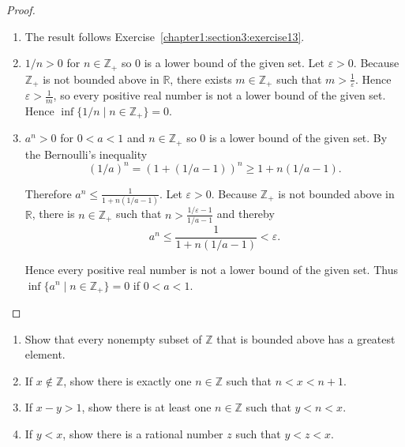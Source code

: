\begin{proof}
    \begin{enumerate}[label={(\alph*)}]
        \item The result follows Exercise~\ref{chapter1:section3:exercise13}.
        \item $1/n > 0$ for $n\in\mathbb{Z}_{+}$ so $0$ is a lower bound of the given set. Let $\varepsilon > 0$. Because $\mathbb{Z}_{+}$ is not bounded above in $\mathbb{R}$, there exists $m\in\mathbb{Z}_{+}$ such that $m > \frac{1}{\varepsilon}$. Hence $\varepsilon > \frac{1}{m}$, so every positive real number is not a lower bound of the given set. Hence $\inf\{ 1/n \mid n\in\mathbb{Z}_{+} \} = 0$.
        \item $a^{n} > 0$ for $0 < a < 1$ and $n\in\mathbb{Z}_{+}$ so $0$ is a lower bound of the given set. By the Bernoulli's inequality
              \[
                  {\left(1/a\right)}^{n} = {\left(1 + (1/a - 1)\right)}^{n} \geq 1 + n(1/a - 1).
              \]

              Therefore $a^{n} \leq \frac{1}{1 + n(1/a - 1)}$. Let $\varepsilon > 0$. Because $\mathbb{Z}_{+}$ is not bounded above in $\mathbb{R}$, there is $n\in\mathbb{Z}_{+}$ such that $n > \frac{1/\varepsilon - 1}{1/a - 1}$ and thereby
              \[
                  a^{n} \leq \frac{1}{1 + n(1/a - 1)} < \varepsilon.
              \]

              Hence every positive real number is not a lower bound of the given set. Thus $\inf\{ a^{n} \mid n\in\mathbb{Z}_{+} \} = 0$ if $0 < a < 1$.
    \end{enumerate}
\end{proof}

\begin{exercise}\label{chapter1:section4:exercise9}
    \begin{enumerate}[label={(\alph*)}]
        \item Show that every nonempty subset of $\mathbb{Z}$ that is bounded above has a greatest element.
        \item If $x\notin\mathbb{Z}$, show there is exactly one $n\in\mathbb{Z}$ such that $n < x < n + 1$.
        \item If $x - y > 1$, show there is at least one $n\in \mathbb{Z}$ such that $y < n < x$.
        \item If $y < x$, show there is a rational number $z$ such that $y < z < x$.
    \end{enumerate}
\end{exercise}

